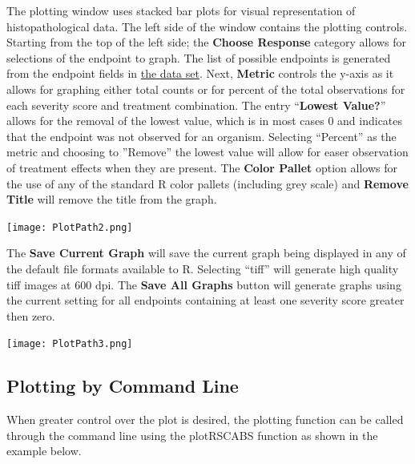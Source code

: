 \documentclass[a4paper]{article}
\begin{document}
	The plotting window uses stacked bar plots for visual representation of histopathological data.  The left side of the window contains the plotting controls.  Starting from the top of the left side; the \textbf{Choose Response} 
	category allows for selections of the endpoint to graph.  
	The list of possible endpoints is generated from the endpoint fields in \hyperlink{fig:Data}{the data set}.  
	Next, \hypertarget{here:metric}{\textbf{Metric}} controls the y-axis as it allows for 
	graphing either total counts or for percent of the total observations for each severity score and treatment combination.
	The entry ``\textbf{Lowest Value?}'' allows for the removal of the
	lowest value, which is in most cases 0 and indicates that the endpoint was not observed for an organism.  Selecting ``Percent'' as 
	the metric and choosing to ''Remove'' the lowest value will allow for easer observation of treatment effects when they are present. 
	The \textbf{Color Pallet} option allows for the use of any of the standard R color pallets (including grey scale) and \textbf{Remove Title} will 
	remove the title from the graph. 
	
\begin{center}
\texttt{[image: PlotPath2.png]}
\end{center} 
\par

The \textbf{Save Current Graph} will save the current graph being displayed in any of the default file formats available to R.  Selecting ``tiff'' will generate high quality tiff images 
at 600 dpi.  
The \textbf{Save All Graphs} button will generate graphs using the current setting for all endpoints containing 
at least one severity score greater then zero.          

\label{fig:PlottingFormates}
\hypertarget{fig:PlottingFormates}{}
\begin{center}
\texttt{[image: PlotPath3.png]}
\end{center} 


\par

\subsection*{Plotting by Command Line}
\label{subsec:PlottinCommand}

When greater control over the plot is desired, the plotting function can be called through the command line 
using the plotRSCABS function as shown in the example below.
    
\end{document}
